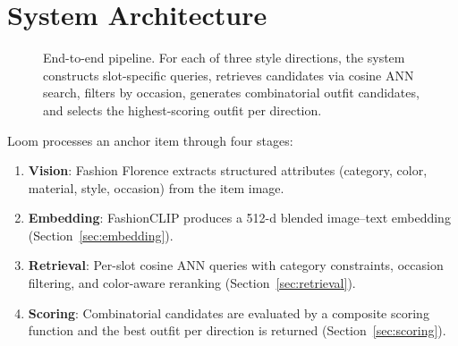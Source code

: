 \documentclass[10pt,twocolumn]{article}
\begin{document}
\section{System Architecture}
\label{sec:architecture}

\begin{figure}[t]
\centering
{}
\caption{End-to-end pipeline.  For each of three style directions, the
system constructs slot-specific queries, retrieves candidates via cosine ANN
search, filters by occasion, generates combinatorial outfit candidates, and
selects the highest-scoring outfit per direction.}
\label{fig:pipeline}
\end{figure}

Loom processes an anchor item through four stages:

\begin{enumerate}[leftmargin=*,topsep=2pt,itemsep=1pt]
\item \textbf{Vision}: Fashion Florence \citep{berlia2026florence} extracts
  structured attributes (category, color, material, style, occasion) from the
  item image.
\item \textbf{Embedding}: FashionCLIP produces a 512-d blended
  image--text embedding (Section~\ref{sec:embedding}).
\item \textbf{Retrieval}: Per-slot cosine ANN queries with category
  constraints, occasion filtering, and color-aware reranking
  (Section~\ref{sec:retrieval}).
\item \textbf{Scoring}: Combinatorial candidates are evaluated by
  a composite scoring function and the best outfit per direction is returned
  (Section~\ref{sec:scoring}).
\end{enumerate}
\end{document}
